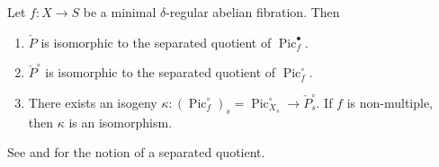 \documentclass[reqno, letterpaper]{amsart}
\numberwithin{equation}{subsection}
\let\to\longrightarrow
\DeclareMathOperator{\Pic}{Pic}
\begin{document}
		\begin{proposition} \label{prop:dual Neron model is Picard}
			Let $f : X \to S$ be a minimal $\delta$-regular abelian fibration. Then
			\begin{enumerate}
				\item $\check P$ is isomorphic to the separated quotient of $\Pic^\bullet_f$.
				\item $\check P^\circ$ is isomorphic to the separated quotient of $\Pic^\circ_f$.
				\item There exists an isogeny $\kappa : (\Pic^\circ_f)_s = \Pic^\circ_{X_s} \to \check P^\circ_s$. If $f$ is non-multiple, then $\kappa$ is an isomorphism.
			\end{enumerate}
		\end{proposition}
		
		See \cite[\S 1.1]{hol19} and \cite[\S 2.3]{kim24} for the notion of a separated quotient.
		
\end{document}

